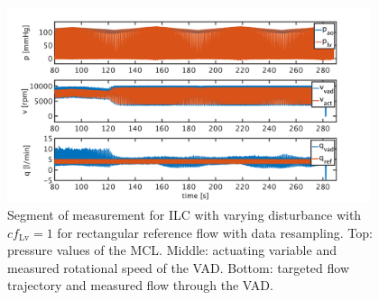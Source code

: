 \begin{figure}[ht!]
  \centering
  \includegraphics[width=0.95\textwidth]{images/chapt_5/ILC/ilc_var_dist_fix_rect.pdf}
  \caption[Segment of measurement for ILC with varying disturbance with $cf_{\mathrm{Lv}}=1$ for rectangular reference flow with data resampling]{Segment of measurement for ILC with varying disturbance with $cf_{\mathrm{Lv}}=1$ for rectangular reference flow with data resampling. Top:  pressure values of the MCL. Middle: actuating variable and measured rotational speed of the VAD. Bottom: targeted flow trajectory and measured flow through the VAD.}
   \label{fig:anh_14}
\end{figure}
